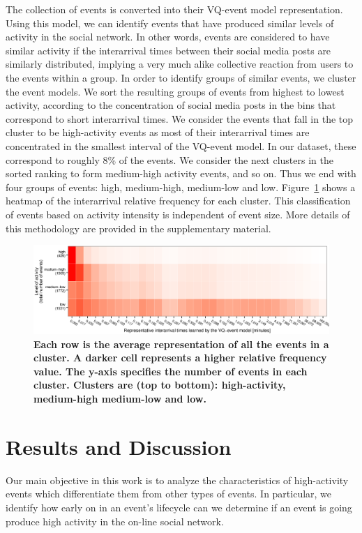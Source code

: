 \documentclass[10pt,letterpaper]{article}
\newcommand{\newtext}[1]{{\leavevmode\color{blue}#1}}
\begin{document}
The collection of events is converted into their VQ-event model
representation. Using this model, we can identify events that have
produced similar levels of activity in the social network. In other
words, events are considered to have similar activity if the
interarrival times between their social media posts are similarly
distributed, implying a very much alike collective reaction from users
to the events within a group. In order to identify groups of similar
events, we cluster the event models. We sort the resulting groups of
events from highest to lowest activity, according to the concentration
of social media posts in the bins that correspond to short
interarrival times. We consider the events that fall in the top
cluster to be high-activity events as most of their interarrival times
are concentrated in the smallest interval of the VQ-event model.  In
our dataset, these correspond to roughly 8\% of the events.  We
consider the next clusters in the sorted ranking to form medium-high
activity events, and so on.  Thus we end with four groups of events:
high, medium-high, medium-low and low. Figure~\ref{fig:fig3} shows a
heatmap of the interarrival relative frequency for each cluster. This
classification of events based on activity intensity is independent of
event size. More details of this methodology are provided in the
supplementary material.

\begin{figure}
   \includegraphics[width=\textwidth]{figures/plots_revision/fig3}
  \caption{\textbf{Each row is the average representation of all the
      events in a cluster.  A darker cell represents a higher
      relative frequency value.  The y-axis specifies the number of events in
      each
      cluster.  Clusters are (top to bottom): high-activity, medium-high
      medium-low and low.}
  }
  \label{fig:fig3}
\end{figure}

\section*{Results and Discussion}
Our main objective in this work is to analyze the
  characteristics of high-activity events which differentiate them from
  other types of events. In particular, we identify how early on in an
  event's lifecycle can we determine if an event is going
  produce high activity in the on-line social network.
\end{document}
